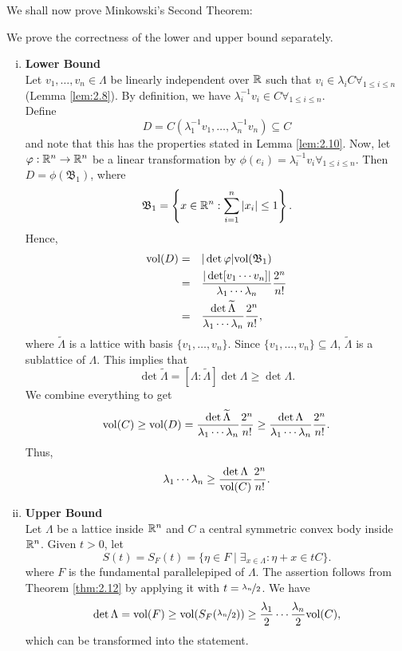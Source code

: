\documentclass{Vorlesungstemplate_English} %
\begin{document}
\renewcommand{\currentLectureDate}{6th May 2026 - \href{https://ecampus.uni-bonn.de/goto_ecampus_file_4149888_download.html}{W4L1}}
    \noindent We shall now prove Minkowski's Second Theorem:
    \begin{pf}
      We prove the correctness of the lower and upper bound separately.
      \begin{enumerate}[(i)]
        \item{\textbf{Lower Bound} \\
        Let $v_1, \dots, v_n \in \Lambda$ be linearly independent over $\mathbb{R}$ such that $v_i \in \lambda_i C \forall_{1 \leq i \leq n}$ (Lemma \ref{lem:2.8}). By definition, we have $\lambda_i^{-1}v_i \in C \forall_{1 \leq i \leq n}$. \\
        Define
        \[ D = C(\lambda_1^{-1}v_1, \dots, \lambda_n^{-1}v_n) \subseteq C\]
        and note that this has the properties stated in Lemma \ref{lem:2.10}. Now, let $\varphi: \mathbb{R}^n \to \mathbb{R}^n$ be a linear transformation by $\phi(e_i) = \lambda_i^{-1}v_i \forall_{1 \leq i \leq n}$. Then $D = \phi(\mathfrak{B}_1)$, where
        \[ \mathfrak{B}_1 = \left\{ x \in \mathbb{R}^n: \sum_{i=1}^n |x_i| \leq 1\right\}.\]
        Hence,
        \begin{align*}
          \text{vol}(D) = \quad & |\det\varphi|\text{vol}(\mathfrak{B}_1) \\
          = \quad & \frac{|\det[v_1\cdots v_n]|}{\lambda_1\cdots\lambda_n}\frac{2^n}{n!} \\
          = \quad & \frac{\det\widetilde{\Lambda}}{\lambda_1\cdots\lambda_n}\frac{2^n}{n!},
        \end{align*}
        where $\widetilde{\Lambda}$ is a lattice with basis $\{ v_1, \dots, v_n\}$. Since $\{ v_1, \dots, v_n\} \subseteq \Lambda$, $\widetilde{\Lambda}$ is a sublattice of $\Lambda$.
        This implies that
        \[ \det\widetilde{\Lambda} = [\Lambda:\widetilde{\Lambda}]\det\Lambda \geq \det\Lambda.\]
        We combine everything to get
        \[ \text{vol}(C) \geq \text{vol}(D) = \frac{\det\widetilde{\Lambda}}{\lambda_1\cdots\lambda_n}\frac{2^n}{n!} \geq \frac{\det\Lambda}{\lambda_1\cdots\lambda_n}\frac{2^n}{n!}.\]Thus,
        \[ \lambda_1\cdots\lambda_n \geq \frac{\det\Lambda}{\text{vol}(C)}\frac{2^n}{n!}.\]}
        \item{\textbf{Upper Bound} \\
        Let $\Lambda$ be a lattice inside $\mathbb{R}^n$ and $C$ a central symmetric convex body inside $\mathbb{R}^n$. Given $t > 0$, let
        \[ S(t) = S_F(t) = \{ \eta \in F \mid \exists_{x \in \Lambda}:\eta+x \in tC\}.\]
        where $F$ is the fundamental parallelepiped of $\Lambda$.
        The assertion follows from Theorem \ref{thm:2.12} by applying it with $t = \nicefrac{\lambda_n}{2}$. We have
        \begin{align*}
          \det\Lambda = \text{vol}(F) \geq \text{vol}(S_F(\nicefrac{\lambda_n}{2})) \geq \frac{\lambda_1}{2}\cdots\frac{\lambda_n}{2}\text{vol}(C),
        \end{align*}
        which can be transformed into the statement. \qedhere}
      \end{enumerate}
    \end{pf}
\end{document}
